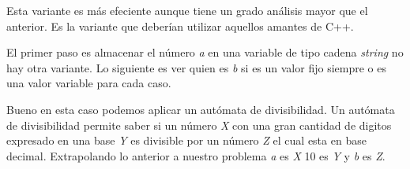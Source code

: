 Esta variante es más efeciente aunque tiene un grado análisis mayor que el anterior. Es la variante que deberían utilizar aquellos amantes  de C++.

El primer paso es almacenar el número {\em a} en una variable de tipo cadena {\em string } no hay otra variante. Lo siguiente es ver quien es {\em b} si es un valor fijo siempre o es una valor variable para cada caso.

Bueno en esta caso podemos aplicar un autómata de divisibilidad. Un autómata de divisibilidad permite saber si un número {\em X} con una gran cantidad de digitos expresado en una base {\em Y} es divisible por un número {\em Z} el cual esta en base decimal. Extrapolando lo anterior a nuestro problema {\em a} es {\em X} 10 es {\em Y} y {\em b} es {\em Z}.